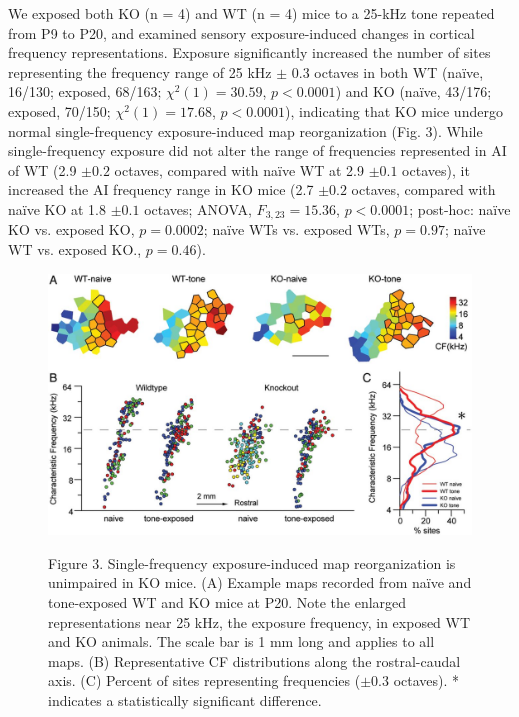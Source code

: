 We exposed both KO (n = 4) and WT (n = 4) mice to a 25-kHz tone repeated from P9 to P20, and examined sensory exposure-induced changes in cortical frequency representations. Exposure significantly increased the number of sites representing the frequency range of 25 kHz $\pm$ 0.3 octaves in both WT (na\"ive, 16/130; exposed, 68/163; $\chi^2(1)=30.59$, $p<0.0001$) and KO (na\"ive, 43/176; exposed, 70/150; $\chi^2(1)=17.68$, $p<0.0001$), indicating that KO mice undergo normal single-frequency exposure-induced map reorganization (Fig. 3). While single-frequency exposure did not alter the range of frequencies represented in AI of WT (2.9 $\pm0.2$ octaves, compared with na\"ive WT at 2.9 $\pm0.1$ octaves), it increased the AI frequency range in KO mice (2.7 $\pm0.2$ octaves, compared with na\"ive KO at 1.8 $\pm0.1$ octaves; ANOVA, $F_{3,23}=15.36$, $p<0.0001$; post-hoc: na\"ive KO vs. exposed KO, $p=0.0002$; na\"ive WTs vs. exposed WTs, $p=0.97$; na\"ive WT vs. exposed KO., $p=0.46$).

\begin{figure}[h]
	\centering
		\includegraphics[width=5in]{images/C3F3}
	\begin{changemargin}{1in}{1in}
	\footnotesize{Figure 3. Single-frequency exposure-induced map reorganization is unimpaired in KO mice. (A) Example maps recorded from na\"ive and tone-exposed WT and KO mice at P20. Note the enlarged representations near 25 kHz, the exposure frequency, in exposed WT and KO animals. The scale bar is 1 mm long and applies to all maps. (B) Representative CF distributions along the rostral-caudal axis. (C) Percent of sites representing frequencies ($\pm0.3$ octaves). * indicates a statistically significant difference.}
	\end{changemargin}
\end{figure}


